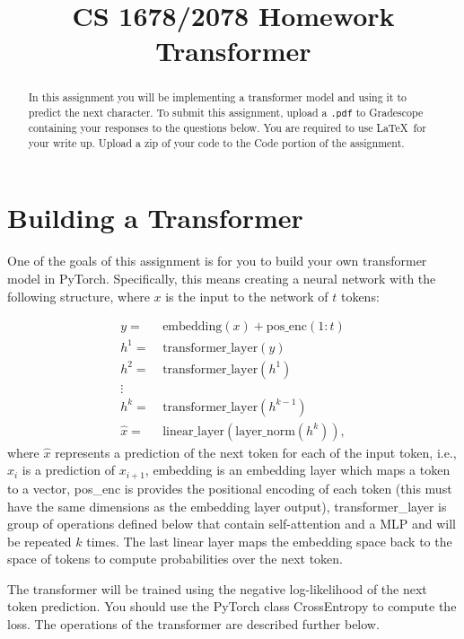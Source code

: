 \documentclass{article}
\title{CS 1678/2078 Homework Transformer}
\begin{document}
\maketitle

\begin{abstract}
    In this assignment you will be implementing a transformer model and using it to predict the next character. 
    To submit this assignment, upload a \texttt{.pdf} to Gradescope containing your responses to the questions below. You are required to use \LaTeX~for your write up. Upload a zip of your code to the Code portion of the assignment.   
\end{abstract}

\section{Building a Transformer}
One of the goals of this assignment is for you to build your own transformer model in PyTorch. Specifically, this means creating a neural network with the following structure, where $x$ is the input to the network of $t$ tokens:  

\begin{align}
    y = &\ \textrm{embedding}(x) + \textrm{pos\_enc}(1:t) \\
    h^1 = &\ \textrm{transformer\_layer}(y) \\
    h^2 = &\ \textrm{transformer\_layer}(h^1)\\
    \vdots \\
    h^{k} = &\ \textrm{transformer\_layer}(h^{k-1}) \\
    \hat x= &\ \textrm{linear\_layer}(\textrm{layer\_norm}(h^k)),
\end{align}
where $\hat x$ represents a prediction of the next token for each of the input token, i.e., $\hat x_{i}$ is a prediction of $x_{i+1}$, \textrm{embedding} is an embedding layer which maps a token to a vector, \textrm{pos\_enc} is provides the positional encoding of each token (this must have the same dimensions as the embedding layer output), \textrm{transformer\_layer} is group of operations defined below that contain self-attention and a MLP and will be repeated $k$ times. The last linear layer maps the embedding space back to the space of tokens to compute probabilities over the next token. 

The transformer will be trained using the negative log-likelihood of the next token prediction. You should use the PyTorch class CrossEntropy to compute the loss. 
%
The operations of the transformer are described further below. 
\end{document}
